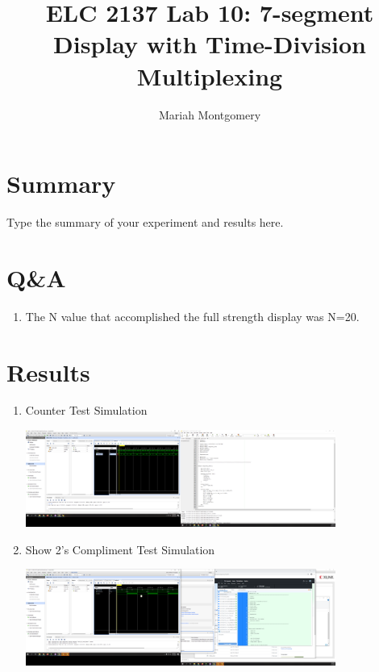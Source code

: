 \documentclass[11pt]{article}
\begin{document}
\title{ELC 2137 Lab 10: 7-segment Display with Time-Division Multiplexing}
\author{Mariah Montgomery}

\maketitle


\section*{Summary}

Type the summary of your experiment and results here.  


\section*{Q\&A}

\begin{enumerate}
	\item The N value that accomplished the full strength display was N=20.
\end{enumerate}


\section*{Results}

\begin{enumerate}
	
	\item Counter Test Simulation
	
	\includegraphics[width=0.8\textwidth, trim= 28.5cm 16cm 68cm 5.5cm, clip]{counter_test.PNG}
	\label{fig:Counter Test Simulation}
	
	\item Show 2's Compliment Test Simulation 
	
	\includegraphics[width=0.8\textwidth, trim= 28.5cm 16cm 68cm 5.5cm, clip]{show_2c_test.PNG}
	\label{fig:Show 2's Compliment Test Simulation}
\end{enumerate}
\end{document}
